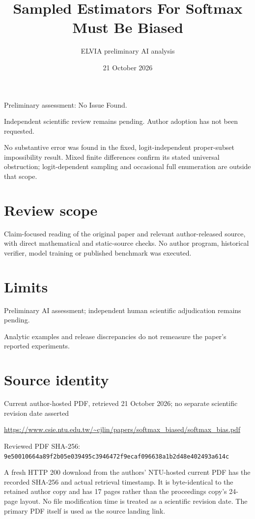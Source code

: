 \documentclass[11pt]{article}
\begin{document}
\title{Sampled Estimators For Softmax Must Be Biased}

\author{ELVIA preliminary AI analysis}\date{21 October 2026}\maketitle

Preliminary assessment: No Issue Found.\par

Independent scientific review remains pending. Author adoption has not been requested.

No substantive error was found in the fixed, logit-independent proper-subset impossibility result. Mixed finite differences confirm its stated universal obstruction; logit-dependent sampling and occasional full enumeration are outside that scope.

\section*{Review scope}

Claim-focused reading of the original paper and relevant author-released source, with direct mathematical and static-source checks. No author program, historical verifier, model training or published benchmark was executed.

\section*{Limits}

Preliminary AI assessment; independent human scientific adjudication remains pending.\par

Analytic examples and release discrepancies do not remeasure the paper’s reported experiments.\par

\section*{Source identity}

Current author-hosted PDF, retrieved 21 October 2026; no separate scientific revision date asserted

\url{https://www.csie.ntu.edu.tw/~cjlin/papers/softmax_biased/softmax_bias.pdf}

Reviewed PDF SHA-256: \nolinkurl{9e50010664a89f2b05e039495c3946472f9ecaf096638a1b2d48e402493a614c}

A fresh HTTP 200 download from the authors’ NTU-hosted current PDF has the recorded SHA-256 and actual retrieval timestamp. It is byte-identical to the retained author copy and has 17 pages rather than the proceedings copy’s 24-page layout. No file modification time is treated as a scientific revision date. The primary PDF itself is used as the source landing link.
\end{document}
